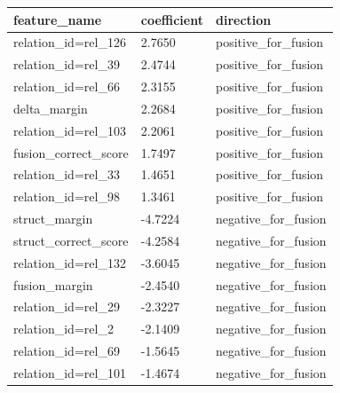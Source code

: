 \begin{tabular}{lll}
\toprule
feature_name & coefficient & direction \\
\midrule
relation_id=rel_126 & 2.7650 & positive_for_fusion \\
relation_id=rel_39 & 2.4744 & positive_for_fusion \\
relation_id=rel_66 & 2.3155 & positive_for_fusion \\
delta_margin & 2.2684 & positive_for_fusion \\
relation_id=rel_103 & 2.2061 & positive_for_fusion \\
fusion_correct_score & 1.7497 & positive_for_fusion \\
relation_id=rel_33 & 1.4651 & positive_for_fusion \\
relation_id=rel_98 & 1.3461 & positive_for_fusion \\
struct_margin & -4.7224 & negative_for_fusion \\
struct_correct_score & -4.2584 & negative_for_fusion \\
relation_id=rel_132 & -3.6045 & negative_for_fusion \\
fusion_margin & -2.4540 & negative_for_fusion \\
relation_id=rel_29 & -2.3227 & negative_for_fusion \\
relation_id=rel_2 & -2.1409 & negative_for_fusion \\
relation_id=rel_69 & -1.5645 & negative_for_fusion \\
relation_id=rel_101 & -1.4674 & negative_for_fusion \\
\bottomrule
\end{tabular}
